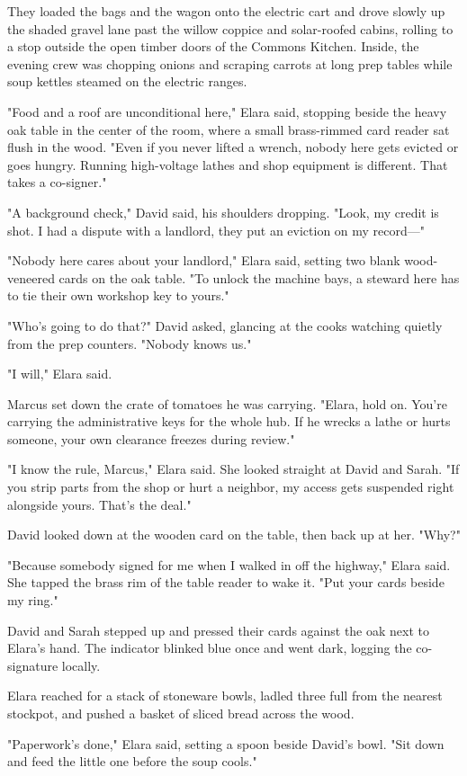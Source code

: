 They loaded the bags and the wagon onto the electric cart and drove slowly up the shaded gravel lane past the willow coppice and solar-roofed cabins, rolling to a stop outside the open timber doors of the Commons Kitchen. Inside, the evening crew was chopping onions and scraping carrots at long prep tables while soup kettles steamed on the electric ranges.

"Food and a roof are unconditional here," Elara said, stopping beside the heavy oak table in the center of the room, where a small brass-rimmed card reader sat flush in the wood. "Even if you never lifted a wrench, nobody here gets evicted or goes hungry. Running high-voltage lathes and shop equipment is different. That takes a co-signer."

"A background check," David said, his shoulders dropping. "Look, my credit is shot. I had a dispute with a landlord, they put an eviction on my record—"

"Nobody here cares about your landlord," Elara said, setting two blank wood-veneered cards on the oak table. "To unlock the machine bays, a steward here has to tie their own workshop key to yours."

"Who's going to do that?" David asked, glancing at the cooks watching quietly from the prep counters. "Nobody knows us."

"I will," Elara said.

Marcus set down the crate of tomatoes he was carrying. "Elara, hold on. You're carrying the administrative keys for the whole hub. If he wrecks a lathe or hurts someone, your own clearance freezes during review."

"I know the rule, Marcus," Elara said. She looked straight at David and Sarah. "If you strip parts from the shop or hurt a neighbor, my access gets suspended right alongside yours. That's the deal."

David looked down at the wooden card on the table, then back up at her. "Why?"

"Because somebody signed for me when I walked in off the highway," Elara said. She tapped the brass rim of the table reader to wake it. "Put your cards beside my ring."

David and Sarah stepped up and pressed their cards against the oak next to Elara's hand. The indicator blinked blue once and went dark, logging the co-signature locally.

Elara reached for a stack of stoneware bowls, ladled three full from the nearest stockpot, and pushed a basket of sliced bread across the wood.

"Paperwork's done," Elara said, setting a spoon beside David's bowl. "Sit down and feed the little one before the soup cools."
